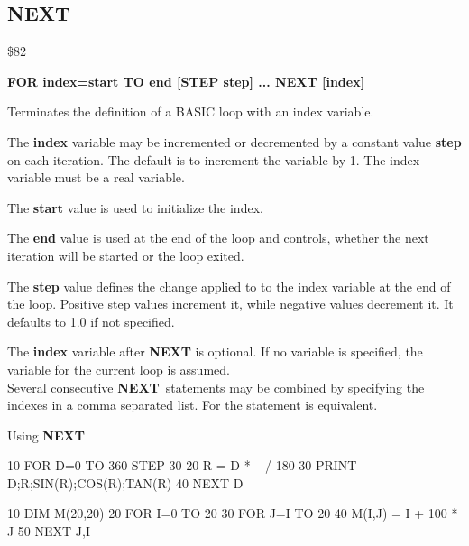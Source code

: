\subsection{NEXT}
\begin{description}[leftmargin=3cm,style=nextline]
\item [Token:] \$82
\item [Format:] {\bf FOR index=start TO end [STEP step] ... NEXT [index]}
\item [Usage:] Terminates the definition
               of a BASIC loop with an index variable.

               The {\bf index} variable may be incremented or decremented
               by a constant value {\bf step} on each iteration. The default
               is to increment the variable by 1.
               The index variable must be a real variable.

               The {\bf start} value is used to initialize the index.

               The {\bf end} value is used at the end of the loop
               and controls, whether the next iteration will be started
               or the loop exited.

               The {\bf step} value defines the change applied to
               to the index variable at the end of the loop.
               Positive step values increment it, while negative values
               decrement it. It defaults to 1.0 if not specified.

\item [Remarks:] The {\bf index} variable after {\bf NEXT} is
               optional. If no variable is specified, the variable
               for the current loop is assumed. \\
               Several consecutive {\bf NEXT} statements may be
               combined by specifying the indexes in a comma
               separated list. For
                the statement
                is equivalent.

\item [Example:] Using {\bf NEXT}
\begin{screenoutput}
10 FOR D=0 TO 360 STEP 30
20 R = D * ~ / 180
30 PRINT D;R;SIN(R);COS(R);TAN(R)
40 NEXT D

10 DIM M(20,20)
20 FOR I=0 TO 20
30 FOR J=I TO 20
40 M(I,J) = I + 100 * J
50 NEXT J,I
\end{screenoutput}
\end{description}

